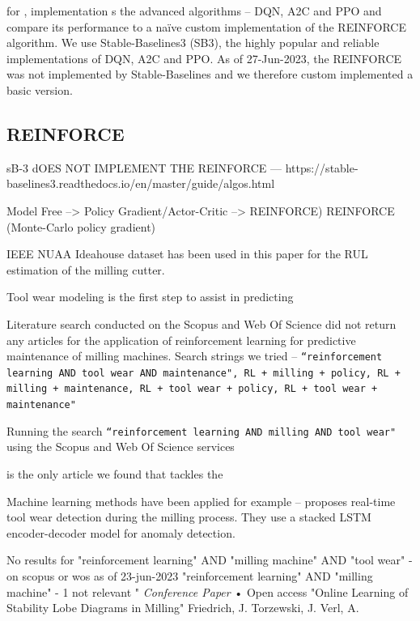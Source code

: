 \documentclass[a4paper, 12pt]{article}
\begin{document}
 for  , implementation s  the advanced algorithms -- DQN, A2C and PPO and compare its performance to a na\"ive custom implementation of the REINFORCE algorithm. We use Stable-Baselines3 (SB3), the highly popular and reliable implementations of DQN, A2C and PPO. As of 27-Jun-2023, the REINFORCE was not implemented by Stable-Baselines and we therefore custom implemented a basic version. 

\subsection{REINFORCE}
sB-3 dOES NOT IMPLEMENT THE REINFORCE	 --- https://stable-baselines3.readthedocs.io/en/master/guide/algos.html

Model Free --> Policy Gradient/Actor-Critic --> REINFORCE)
REINFORCE (Monte-Carlo policy gradient) 


IEEE NUAA Ideahouse dataset has been used in this paper for the RUL estimation of the milling cutter. \cite{NUAA-data-set}



Tool wear modeling is the first step to assist in predicting 


Literature search conducted on the Scopus\texttrademark{} and Web Of Science\texttrademark{} did not return any articles for the application of reinforcement learning for predictive maintenance of milling machines. Search strings we tried -- \texttt{``reinforcement learning AND tool wear AND maintenance", RL + milling + policy, RL + milling + maintenance, RL + tool wear + policy, RL + tool wear + maintenance"} 

Running the search \texttt{``reinforcement learning AND milling AND tool wear"} using the Scopus\texttrademark{} and Web Of Science\texttrademark{} services 

\cite{dai2021reinforcement} is the only article we found that tackles the 

Machine learning methods have been applied for example --
\cite{oshida2023development} proposes real-time tool wear detection during the milling process. They use a stacked LSTM encoder-decoder model for anomaly detection.


No results for "reinforcement learning" AND "milling machine" AND "tool wear" - on scopus or wos as of 23-jun-2023
"reinforcement learning" AND "milling machine" - 1 not relevant "	
\textit{Conference Paper}  •  Open access "Online Learning of Stability Lobe Diagrams in Milling" 	
Friedrich, J. Torzewski, J.  Verl, A.
\end{document}
